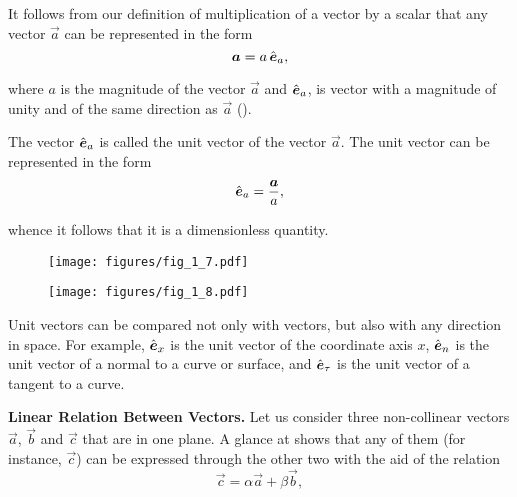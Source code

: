 It follows from our definition of multiplication of a vector by a scalar that any vector $\vec{a}$ can be represented in the form
\begin{equation}\label{eq:1_3}
\boldsymbol{a} = a\,\hat{\boldsymbol{e}}_{a},
\end{equation} 

\noindent
where $a$ is the magnitude of the vector $\vec{a}$ and $\hat{\boldsymbol{e}}_{a}$, is vector with a magnitude of unity and of the same direction as $\vec{a}$ ().

The vector $\hat{\boldsymbol{e}}_{a}$ is called the unit vector of the vector $\vec{a}$. The unit vector can be represented in the form
\begin{equation}\label{eq:1_4}
\hat{\boldsymbol{e}}_{a} = \frac{\boldsymbol{a}}{a},
\end{equation}

\noindent
whence it follows that it is a dimensionless quantity.

\begin{figure}[t]
	\begin{minipage}[t]{0.5\linewidth}
		\begin{center}
			\texttt{[image: figures/fig\_1\_7.pdf]}
			\caption[]{}
			\label{fig:1_7}
		\end{center}
	\end{minipage}
	\hfill{ }%
	\begin{minipage}[t]{0.5\linewidth}
		\begin{center}
			\texttt{[image: figures/fig\_1\_8.pdf]}
			\caption[]{}
			\label{fig:1_8}
		\end{center}
	\end{minipage}
\vspace{-0.6cm}
\end{figure}

Unit vectors can be compared not only with vectors, but also with any direction in space. For example, $\hat{\boldsymbol{e}}_{x}$ is the unit vector of the coordinate axis $x$, $\hat{\boldsymbol{e}}_{n}$ is the unit vector of a normal to a curve or surface, and $\hat{\boldsymbol{e}}_{\tau}$ is the unit vector of a tangent to a curve.

\textbf{Linear Relation Between Vectors.} Let us consider three non-collinear vectors $\vec{a}$, $\vec{b}$ and $\vec{c}$ that are in one plane. A glance at  shows that any of them (for instance, $\vec{c}$) can be expressed through the other two with the aid of the relation
\begin{equation}\label{eq:1_5}
\vec{c} = \alpha\vec{a} + \beta\vec{b},
\end{equation}


